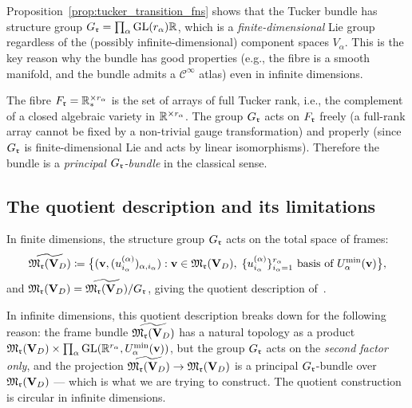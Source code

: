 \begin{remark}
\label{rem:tucker_principal}
Proposition~\ref{prop:tucker_transition_fns} shows that the Tucker
bundle has structure group $G_{\mathfrak{r}} = \prod_\alpha \mathrm{GL}(r_\alpha){\mathbb{R}}$,
which is a \emph{finite-dimensional} Lie group regardless of the
(possibly infinite-dimensional) component spaces $V_\alpha$. This is
the key reason why the bundle has good properties (e.g., the fibre is
a smooth manifold, and the bundle admits a $\mathcal{C}^\infty$ atlas)
even in infinite dimensions.

The fibre $F_{\mathfrak{r}} = \mathbb{R}^{\times r_\alpha}_*$ is the set of arrays of
full Tucker rank, i.e., the complement of a closed algebraic variety
in $\mathbb{R}^{\times r_\alpha}$. The group $G_{\mathfrak{r}}$ acts on $F_{\mathfrak{r}}$ freely
(a full-rank array cannot be fixed by a non-trivial gauge
transformation) and properly (since $G_{\mathfrak{r}}$ is finite-dimensional Lie
and acts by linear isomorphisms). Therefore the bundle is a
\emph{principal $G_{\mathfrak{r}}$-bundle} in the classical sense.
\end{remark}

\subsection*{The quotient description and its limitations}

In finite dimensions, the structure group $G_{\mathfrak{r}}$ acts on the
total space of frames:
\begin{equation}
\label{eq:tucker_frame_bundle}
    \widetilde{\mathfrak{M}_{\mathfrak{r}}(\mathbf{V}_D)}
    \coloneqq
    \bigl\{
        (\mathbf{v}, (u^{(\alpha)}_{i_\alpha})_{\alpha,i_\alpha}) :
        \mathbf{v} \in \mathfrak{M}_{\mathfrak{r}}(\mathbf{V}_D),\;
        \{u^{(\alpha)}_{i_\alpha}\}_{i_\alpha=1}^{r_\alpha}
        \text{ basis of } U^{\min}_{\alpha}(\mathbf{v})
    \bigr\},
\end{equation}
and $\mathfrak{M}_{\mathfrak{r}}(\mathbf{V}_D) = \widetilde{\mathfrak{M}_{\mathfrak{r}}(\mathbf{V}_D)} / G_{\mathfrak{r}}$, giving
the quotient description of~\cite{KochLubich2007,UschmajewVandereycken2013}.

In infinite dimensions, this quotient description breaks down for the
following reason: the frame bundle $\widetilde{\mathfrak{M}_{\mathfrak{r}}(\mathbf{V}_D)}$ has
a natural topology as a product $\mathfrak{M}_{\mathfrak{r}}(\mathbf{V}_D) \times
\prod_\alpha \mathrm{GL}(\mathbb{R}^{r_\alpha}, U^{\min}_{\alpha}(\mathbf{v}))$, but the
group $G_{\mathfrak{r}}$ acts on the \emph{second factor only}, and the projection
$\widetilde{\mathfrak{M}_{\mathfrak{r}}(\mathbf{V}_D)} \to \mathfrak{M}_{\mathfrak{r}}(\mathbf{V}_D)$ is a principal
$G_{\mathfrak{r}}$-bundle over $\mathfrak{M}_{\mathfrak{r}}(\mathbf{V}_D)$ --- which is what we are trying
to construct. The quotient construction is circular in infinite
dimensions.

